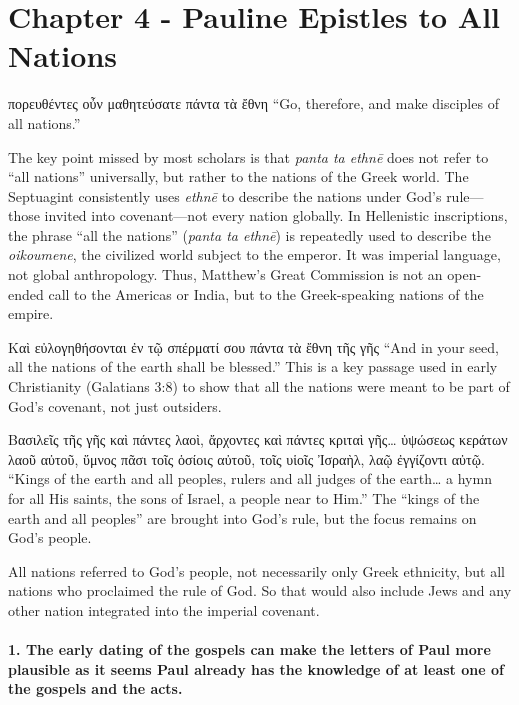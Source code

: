 \hfuzz=5pt %

\section{Chapter 4 - Pauline Epistles to All Nations}\label{sec:chapter-4---pauline-epistles-to-all-nations}

πορευθέντες οὖν μαθητεύσατε πάντα τὰ ἔθνη ``Go, therefore, and make disciples of all nations.''

The key point missed by most scholars is that \textit{panta ta ethnē} does not refer to ``all nations'' universally, but rather to the nations of the Greek world.
The Septuagint consistently uses \textit{ethnē} to describe the nations under God's rule---those invited into covenant---not every nation globally.
In Hellenistic inscriptions, the phrase ``all the nations'' (\textit{panta ta ethnē}) is repeatedly used to describe the \textit{oikoumene}, the civilized world subject to the emperor.
It was imperial language, not global anthropology.
Thus, Matthew’s Great Commission is not an open-ended call to the Americas or India, but to the Greek-speaking nations of the empire.

Καὶ εὐλογηθήσονται ἐν τῷ σπέρματί σου πάντα τὰ ἔθνη τῆς γῆς ``And in your seed, all the nations of the earth shall be blessed.''
This is a key passage used in early Christianity (Galatians 3:8) to show that all the nations were meant to be part of God's covenant, not just outsiders.

Βασιλεῖς τῆς γῆς καὶ πάντες λαοὶ, ἄρχοντες καὶ πάντες κριταὶ γῆς\ldots{} ὑψώσεως κεράτων λαοῦ αὐτοῦ, ὕμνος πᾶσι τοῖς ὁσίοις αὐτοῦ, τοῖς υἱοῖς Ἰσραὴλ, λαῷ ἐγγίζοντι αὐτῷ.
``Kings of the earth and all peoples, rulers and all judges of the earth\ldots{} a hymn for all His saints, the sons of Israel, a people near to Him.''
The ``kings of the earth and all peoples'' are brought into God's rule, but the focus remains on God's people.

All nations referred to God's people, not necessarily only Greek ethnicity, but all nations who proclaimed the rule of God.
So that would also include Jews and any other nation integrated into the imperial covenant.

\paragraph{1.
The early dating of the gospels can make the letters of Paul more plausible as it seems Paul already has the knowledge of at least one of the gospels and the acts.}\label{par:the-early-dating-of-the-gospels-can-make-the-letters-of-paul-more-plausible-as-it-seems-paul-already-has-the-knowledge-of-at-least-one-of-the-gospels-and-the-acts.}

